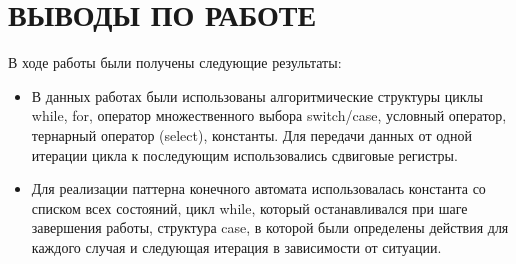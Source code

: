 \documentclass[a4paper,14pt]{article}
\begin{document}
\section{ВЫВОДЫ ПО РАБОТЕ}

В ходе работы были получены следующие результаты:

\begin{itemize}
	\item В данных работах были использованы алгоритмические структуры циклы while, for, оператор множественного выбора switch/case, условный оператор, тернарный оператор (select), константы.
	Для передачи данных от одной итерации цикла к последующим использовались сдвиговые регистры.
	\item Для реализации паттерна конечного автомата использовалась константа со списком всех состояний, цикл while, который останавливался при шаге завершения работы, структура case, в которой были определены действия для каждого случая и следующая итерация в зависимости от ситуации.
\end{itemize}
\end{document}
